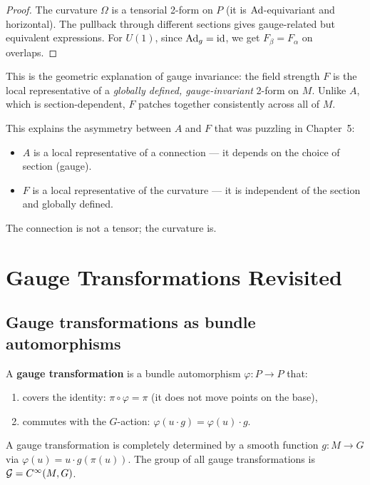 \begin{proof}
The curvature $\Omega$ is a tensorial 2-form on $P$ (it is $\mathrm{Ad}$-equivariant and horizontal). The pullback through different sections gives gauge-related but equivalent expressions. For $U(1)$, since $\mathrm{Ad}_g = \mathrm{id}$, we get $F_\beta = F_\alpha$ on overlaps.
\end{proof}

This is the geometric explanation of gauge invariance: the field strength $F$ is the local representative of a \emph{globally defined, gauge-invariant} 2-form on $M$. Unlike $A$, which is section-dependent, $F$ patches together consistently across all of $M$.

\begin{remark}
This explains the asymmetry between $A$ and $F$ that was puzzling in Chapter~5:
\begin{itemize}
\item $A$ is a local representative of a connection --- it depends on the choice of section (gauge).
\item $F$ is a local representative of the curvature --- it is independent of the section and globally defined.
\end{itemize}
The connection is not a tensor; the curvature is.
\end{remark}

\section{Gauge Transformations Revisited}

\subsection{Gauge transformations as bundle automorphisms}

\begin{definition}
A \textbf{gauge transformation} is a bundle automorphism $\varphi: P \to P$ that:
\begin{enumerate}
\item covers the identity: $\pi \circ \varphi = \pi$ (it does not move points on the base),
\item commutes with the $G$-action: $\varphi(u \cdot g) = \varphi(u) \cdot g$.
\end{enumerate}
\end{definition}

A gauge transformation is completely determined by a smooth function $g: M \to G$ via $\varphi(u) = u \cdot g(\pi(u))$. The group of all gauge transformations is $\mathcal{G} = C^{\infty}(M, G)$.

